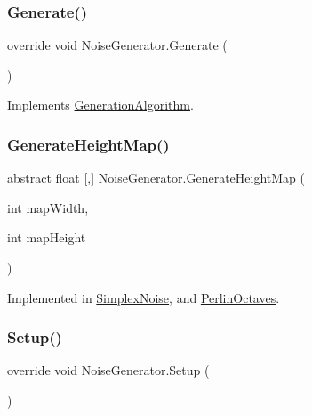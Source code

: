 \subsubsection{\texorpdfstring{Generate()}{Generate()}}
{\footnotesize\ttfamily override void Noise\+Generator.\+Generate (\begin{DoxyParamCaption}{ }\end{DoxyParamCaption})\hspace{0.3cm}{\ttfamily [virtual]}}



Implements \mbox{\hyperlink{class_generation_algorithm_ac2df20f7751c1b480ab958791d5c7d41}{Generation\+Algorithm}}.

\mbox{\label{class_noise_generator_a1d3983a9ad33c2734f373e9f2d8f13d7}} 
\subsubsection{\texorpdfstring{Generate\+Height\+Map()}{GenerateHeightMap()}}
{\footnotesize\ttfamily abstract float \mbox{[},\mbox{]} Noise\+Generator.\+Generate\+Height\+Map (\begin{DoxyParamCaption}\item[{int}]{map\+Width,  }\item[{int}]{map\+Height }\end{DoxyParamCaption})\hspace{0.3cm}{\ttfamily [pure virtual]}}



Implemented in \mbox{\hyperlink{class_simplex_noise_aea5b04e1455da3c6eb8b29deb28a239c}{Simplex\+Noise}}, and \mbox{\hyperlink{class_perlin_octaves_ac5deb001801dbfe9666df3dea023ce7a}{Perlin\+Octaves}}.

\mbox{\label{class_noise_generator_ad87355d424b537a1a4065d525ec18400}} 
\subsubsection{\texorpdfstring{Setup()}{Setup()}}
{\footnotesize\ttfamily override void Noise\+Generator.\+Setup (\begin{DoxyParamCaption}{ }\end{DoxyParamCaption})\hspace{0.3cm}{\ttfamily [virtual]}}



